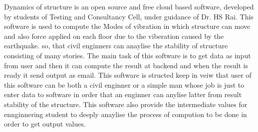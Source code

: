 Dynamics of structure is an open source and free cloud based software, developed by students of 
Testing and Consultancy Cell, under guidance of Dr. HS Rai. This software is used to compute the 
Modes of vibration in which structure can move and also force applied on each floor 
due to the viberation caused by the earthquake. so, that civil enginners can
anaylise the stability of structure consisting of many stories. The main task 
of this software is to get data as input from user and then it can compute 
the result at backend and when the result is ready it send output as email.
This software is structed keep in veiw that user of this software can be both 
a civil enginner or a simple man whose job is just to enter data to software 
in order that an enginner can anylise latter from result stability of the structure.
This software also provide the intermediate values for ennginnering student 
to deeply anaylise the process of compution to be done in order to get output values. 
